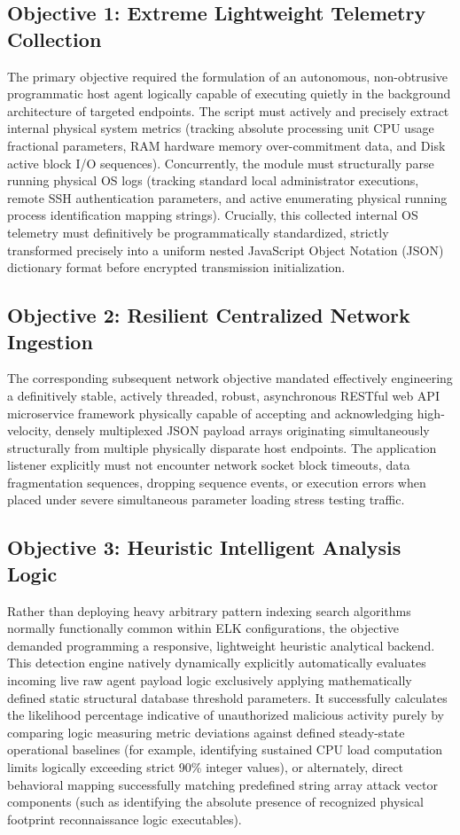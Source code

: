 \subsection{Objective 1: Extreme Lightweight Telemetry Collection}
The primary objective required the formulation of an autonomous, non-obtrusive programmatic host agent logically capable of executing quietly in the background architecture of targeted endpoints. The script must actively and precisely extract internal physical system metrics (tracking absolute processing unit CPU usage fractional parameters, RAM hardware memory over-commitment data, and Disk active block I/O sequences). Concurrently, the module must structurally parse running physical OS logs (tracking standard local administrator executions, remote SSH authentication parameters, and active enumerating physical running process identification mapping strings). Crucially, this collected internal OS telemetry must definitively be programmatically standardized, strictly transformed precisely into a uniform nested JavaScript Object Notation (JSON) dictionary format before encrypted transmission initialization.

\subsection{Objective 2: Resilient Centralized Network Ingestion}
The corresponding subsequent network objective mandated effectively engineering a definitively stable, actively threaded, robust, asynchronous RESTful web API microservice framework physically capable of accepting and acknowledging high-velocity, densely multiplexed JSON payload arrays originating simultaneously structurally from multiple physically disparate host endpoints. The application listener explicitly must not encounter network socket block timeouts, data fragmentation sequences, dropping sequence events, or execution errors when placed under severe simultaneous parameter loading stress testing traffic. 

\subsection{Objective 3: Heuristic Intelligent Analysis Logic}
Rather than deploying heavy arbitrary pattern indexing search algorithms normally functionally common within ELK configurations, the objective demanded programming a responsive, lightweight heuristic analytical backend. This detection engine natively dynamically explicitly automatically evaluates incoming live raw agent payload logic exclusively applying mathematically defined static structural database threshold parameters. It successfully calculates the likelihood percentage indicative of unauthorized malicious activity purely by comparing logic measuring metric deviations against defined steady-state operational baselines (for example, identifying sustained CPU load computation limits logically exceeding strict 90\% integer values), or alternately, direct behavioral mapping successfully matching predefined string array attack vector components (such as identifying the absolute presence of recognized physical footprint reconnaissance logic executables). 

